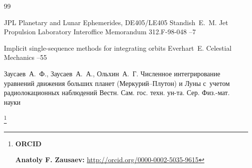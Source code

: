 \begin{thebibliography}{99}

\preprint JPL Planetary and Lunar Ephemerides, DE405/LE405
\by Standish~E.~M.
\preprintinfo Jet Propulsion Laboratory Interoffice Memorandum 312.F-98-048
--7

\paper Implicit single-sequence methods for integrating orbits
\by Everhart~E.
\jour Celestial Mechanics
--55

\by Заусаев~А.~Ф., Заусаев~А.~А., Ольхин~А.~Г.
\paper Численное интегрирование уравнений движения больших планет (Меркурий--Плутон) и Луны с~учетом радиолокационных наблюдений
\jour  Вестн. Сам. гос. техн. ун-та. Сер. Физ.-мат. науки



\end{thebibliography}

\RuDate

\newpage


\makeentitle

\thanks{{\bf ORCID}

{\bf Anatoly F. Zausaev:} \url{http://orcid.org/0000-0002-5035-9615}

}


\EngRef

